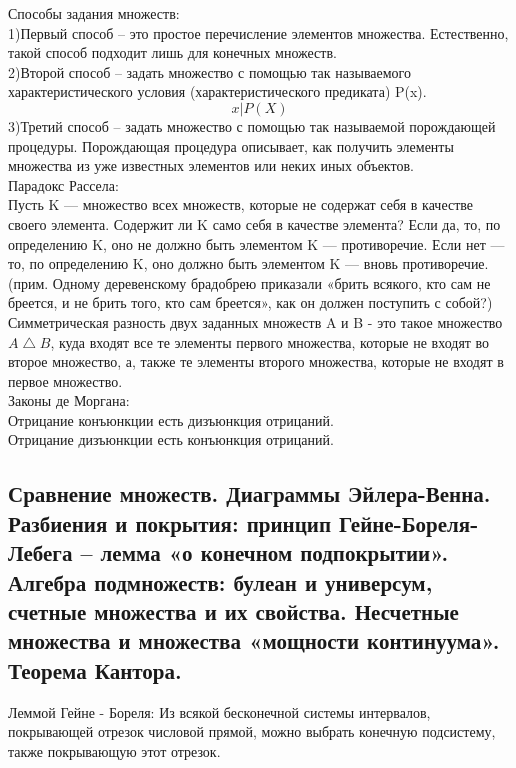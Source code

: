 \documentclass[a4paper, 12pt]{article}
\begin{document}
Способы задания множеств:\\
1)Первый способ – это простое перечисление элементов множества. Естественно, такой способ подходит лишь для конечных множеств.\\
2)Второй способ – задать множество с помощью так называемого характеристического условия (характеристического предиката) P(x).
\[
       {x|P(X)}
\]
3)Третий способ – задать множество с помощью так называемой порождающей процедуры. Порождающая процедура описывает, как получить элементы множества из уже известных элементов или неких иных объектов.\\

Парадокс Рассела:\\ 
Пусть K — множество всех множеств, которые не содержат себя в качестве своего элемента. Содержит ли K само себя в качестве элемента? Если да, то, по определению K, оно не должно быть элементом K — противоречие. Если нет — то, по определению K, оно должно быть элементом K — вновь противоречие.(прим. Одному деревенскому брадобрею приказали «брить всякого, кто сам не бреется, и не брить того, кто сам бреется», как он должен поступить с собой?)\\

Симметрическая разность двух заданных множеств A и B - это такое множество $ A \bigtriangleup B $, куда входят все те элементы первого множества, которые не входят во второе множество, а, также те элементы второго множества, которые не входят в первое множество.\\

Законы де Моргана:\\
Отрицание конъюнкции есть дизъюнкция отрицаний.\\
Отрицание дизъюнкции есть конъюнкция отрицаний.\\

\subsection{Сравнение множеств. Диаграммы Эйлера-Венна. Разбиения и покрытия: принцип Гейне-Бореля-Лебега – лемма «о конечном подпокрытии». Алгебра подмножеств: булеан и универсум, счетные множества и их свойства. Несчетные множества и множества «мощности континуума». Теорема Кантора.}

Леммой Гейне - Бореля: 
Из всякой бесконечной системы интервалов, покрывающей отрезок числовой прямой, можно выбрать конечную подсистему, также покрывающую этот отрезок.\\ 
\end{document}

